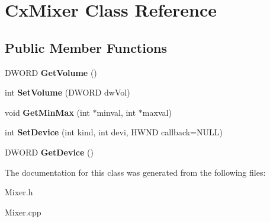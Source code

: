 \hypertarget{class_cx_mixer}{\section{Cx\-Mixer Class Reference}
\label{class_cx_mixer}
}
\subsection*{Public Member Functions}
\begin{DoxyCompactItemize}
\item 
\hypertarget{class_cx_mixer_adf222fb2072208f2e5a65e261bb9bdcc}{D\-W\-O\-R\-D {\bfseries Get\-Volume} ()}\label{class_cx_mixer_adf222fb2072208f2e5a65e261bb9bdcc}

\item 
\hypertarget{class_cx_mixer_aeb4304fe0024fcf28a96162c970cd4fa}{int {\bfseries Set\-Volume} (D\-W\-O\-R\-D dw\-Vol)}\label{class_cx_mixer_aeb4304fe0024fcf28a96162c970cd4fa}

\item 
\hypertarget{class_cx_mixer_ad04aa822d206b58cf8109942dce1ec2c}{void {\bfseries Get\-Min\-Max} (int $\ast$minval, int $\ast$maxval)}\label{class_cx_mixer_ad04aa822d206b58cf8109942dce1ec2c}

\item 
\hypertarget{class_cx_mixer_a4cdd5a7a6cbfdca7fb221aac5aed77e8}{int {\bfseries Set\-Device} (int kind, int devi, H\-W\-N\-D callback=N\-U\-L\-L)}\label{class_cx_mixer_a4cdd5a7a6cbfdca7fb221aac5aed77e8}

\item 
\hypertarget{class_cx_mixer_a72023214610baf977da0f32568c81546}{D\-W\-O\-R\-D {\bfseries Get\-Device} ()}\label{class_cx_mixer_a72023214610baf977da0f32568c81546}

\end{DoxyCompactItemize}


The documentation for this class was generated from the following files\-:\begin{DoxyCompactItemize}
\item 
Mixer.\-h\item 
Mixer.\-cpp\end{DoxyCompactItemize}
